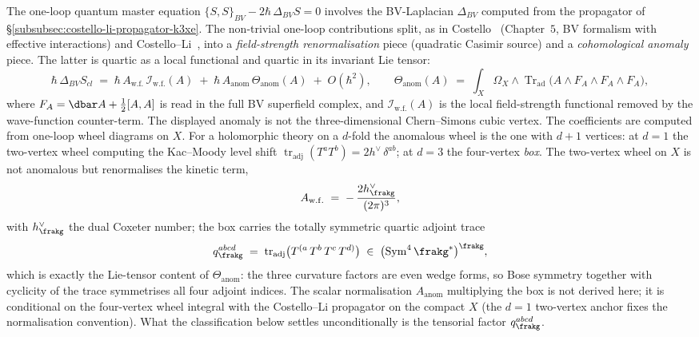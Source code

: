 The one-loop quantum master equation
$\{S, S\}_{BV} - 2 \hbar\, \Delta_{BV} S = 0$
involves the BV-Laplacian $\Delta_{BV}$ computed from the propagator of
\S\ref{subsubsec:costello-li-propagator-k3xe}. The non-trivial one-loop
contributions split, as in Costello~\cite{CostelloRenormalization2011}
\textup{(}Chapter~$5$, BV formalism with effective interactions\textup{)} and Costello--Li~\cite{CostelloLi2012}, into a
\emph{field-strength renormalisation} piece (quadratic Casimir source) and
a \emph{cohomological anomaly} piece. The latter is quartic as a local
functional and quartic in its invariant Lie tensor:
\begin{equation}
\label{eq:6d-hcs-anomaly-decomposition}
 \hbar\, \Delta_{BV} S_{cl}
 \;=\;
 \hbar\, A_{\mathrm{w.f.}}\,\mathcal I_{\mathrm{w.f.}}(A)
 \;+\;
 \hbar\, A_{\mathrm{anom}}\,
 \Theta_{\mathrm{anom}}(A)
 \;+\; O(\hbar^2),
 \qquad
 \Theta_{\mathrm{anom}}(A) \;=\;
 \int_X \Omega_X \wedge
 \operatorname{Tr}_{\mathrm{ad}}\!\bigl(A\wedge F_A\wedge F_A\wedge F_A\bigr),
\end{equation}
where \(F_A=\dbar A+\frac12[A,A]\) is read in the full BV superfield
complex, and \(\mathcal I_{\mathrm{w.f.}}(A)\) is the local
field-strength functional removed by the wave-function counter-term. The
displayed anomaly is not the three-dimensional Chern--Simons cubic
vertex.
The coefficients are computed from one-loop wheel diagrams on $X$. For
a holomorphic theory on a $d$-fold the anomalous wheel is the one with
$d + 1$ vertices: at $d = 1$ the two-vertex wheel computing the
Kac--Moody level shift
$\operatorname{tr}_{\mathrm{adj}}(T^a T^b) = 2h^\vee\,\delta^{ab}$; at
$d = 3$ the four-vertex \emph{box}. The two-vertex wheel on $X$ is not
anomalous but renormalises the kinetic term,
\begin{equation}
\label{eq:trilinear-Casimir-coefficients}
 A_{\mathrm{w.f.}} \;=\; -\,\frac{2 h^\vee_\frakg}{(2\pi)^3},
\end{equation}
with $h^\vee_\frakg$ the dual Coxeter number; the box carries the
totally symmetric quartic adjoint trace
\begin{equation}
\label{eq:quartic-box-tensor}
 q^{abcd}_\frakg
 \;=\;
 \operatorname{tr}_{\mathrm{adj}}\bigl(T^{(a}\, T^{b}\, T^{c}\, T^{d)}\bigr)
 \;\in\; \bigl(\operatorname{Sym}^4 \frakg^*\bigr)^{\frakg},
\end{equation}
which is exactly the Lie-tensor content of $\Theta_{\mathrm{anom}}$:
the three curvature factors are even wedge forms, so Bose symmetry
together with cyclicity of the trace symmetrises all four adjoint
indices. The scalar normalisation $A_{\mathrm{anom}}$ multiplying the
box is not derived here; it is conditional on the four-vertex wheel
integral with the Costello--Li propagator on the compact $X$ (the
$d = 1$ two-vertex anchor fixes the normalisation convention). What
the classification below settles unconditionally is the tensorial
factor $q^{abcd}_\frakg$.


